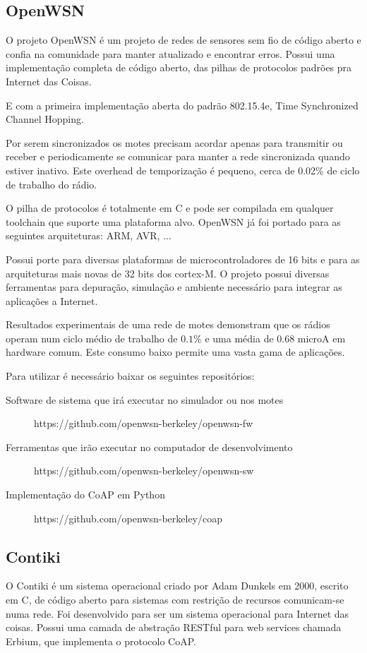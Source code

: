 \subsection{OpenWSN}

O projeto OpenWSN \'e um projeto de redes de sensores sem fio de c\'odigo aberto e confia na comunidade para manter atualizado e encontrar erros. Possui uma implementa\c{c}\~ao completa de c\'odigo aberto, das pilhas de protocolos padr\~oes pra Internet das Coisas.

E com a primeira implementa\c{c}\~ao aberta do padr\~ao 802.15.4e, Time Synchronized Channel Hopping.

Por serem sincronizados os motes precisam acordar apenas para transmitir ou receber e periodicamente se comunicar para manter a rede sincronizada quando estiver inativo. Este overhead de temporiza\c{c}\~ao \'e pequeno, cerca de 0.02\% de ciclo de trabalho do r\'adio. \cite{openWSNPaper}

O pilha de protocolos \'e totalmente em C e pode ser compilada em qualquer toolchain que suporte uma plataforma alvo. OpenWSN j\'a foi portado para as seguintes arquiteturas: ARM, AVR, ...

Possui porte para diversas plataformas de microcontroladores de 16 bits e para as arquiteturas mais novas de 32 bits dos cortex-M. O projeto possui diversas ferramentas para depura\c{c}\~ao, simula\c{c}\~ao e ambiente necess\'ario para integrar as aplica\c{c}\~oes a Internet.\cite{openWSN}

Resultados experimentais de uma rede de motes demonstram que os r\'adios operam num ciclo m\'edio de trabalho de $0.1\%$ e uma m\'edia de 0.68 microA em hardware comum. Este consumo baixo permite uma vasta gama de aplica\c{c}\~oes.

Para utilizar \'e necess\'ario baixar os seguintes reposit\'orios:
\begin{description}
    \item [Software de sistema que ir\'a executar no simulador ou nos motes] https://github.com/openwsn-berkeley/openwsn-fw
    \item [Ferramentas que ir\~ao executar no computador de desenvolvimento] https://github.com/openwsn-berkeley/openwsn-sw 
    \item[Implementa\c{c}\~ao do CoAP em Python] https://github.com/openwsn-berkeley/coap
\end{description}


\subsection{Contiki}
O Contiki \'e um sistema operacional criado por Adam Dunkels em 2000, escrito em C, de c\'odigo aberto para sistemas com restri\c{c}\~ao de recursos comunicam-se numa rede. Foi desenvolvido para ser um sistema operacional para Internet das coisas. Possui uma camada de abstra\c{c}\~ao RESTful para web services chamada Erbium, que implementa o protocolo CoAP.


